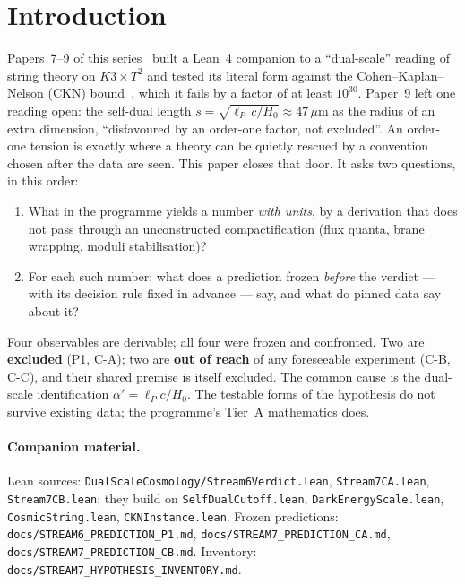 \documentclass[11pt,a4paper]{article}
\theoremstyle{remark}
\begin{document}
\tableofcontents

\section{Introduction}
\label{sec:intro}

Papers~7--9 of this series~\cite{Callens2026Paper7,Callens2026Paper8,Callens2026Paper9} built a
Lean~4 companion to a ``dual-scale'' reading of string theory on $K3\times T^2$ and tested its literal
form against the Cohen--Kaplan--Nelson (CKN) bound~\cite{CKN1999}, which it fails by a factor of at least
$10^{30}$. Paper~9 left one reading open: the self-dual length $s=\sqrt{\ell_P\,c/H_0}\approx47\,\mu$m as
the radius of an extra dimension, ``disfavoured by an order-one factor, not excluded''. An order-one
tension is exactly where a theory can be quietly rescued by a convention chosen after the data are seen.
This paper closes that door. It asks two questions, in this order:
\begin{enumerate}
\item What in the programme yields a number \emph{with units}, by a derivation that does not pass through an
  unconstructed compactification (flux quanta, brane wrapping, moduli stabilisation)?
\item For each such number: what does a prediction frozen \emph{before} the verdict --- with its decision rule
  fixed in advance --- say, and what do pinned data say about it?
\end{enumerate}

\begin{headlinebox}
Four observables are derivable; all four were frozen and confronted. Two are \textbf{excluded} (P1, C-A);
two are \textbf{out of reach} of any foreseeable experiment (C-B, C-C), and their shared premise is
itself excluded. The common cause is the dual-scale identification $\alpha'=\ell_P c/H_0$. The testable
forms of the hypothesis do not survive existing data; the programme's Tier~A mathematics does.
\end{headlinebox}

\paragraph{Companion material.} Lean sources: \texttt{DualScaleCosmology/\allowbreak Stream6Verdict.lean},
\texttt{Stream7CA.lean}, \texttt{Stream7CB.lean}; they build on \texttt{SelfDualCutoff.lean},
\texttt{DarkEnergyScale.lean}, \texttt{CosmicString.lean}, \texttt{CKNInstance.lean}. Frozen predictions:
\texttt{docs/\allowbreak STREAM6\_PREDICTION\_P1.md}, \texttt{docs/\allowbreak STREAM7\_PREDICTION\_CA.md},
\texttt{docs/\allowbreak STREAM7\_PREDICTION\_CB.md}. Inventory: \texttt{docs/\allowbreak STREAM7\_HYPOTHESIS\_INVENTORY.md}.
\end{document}
